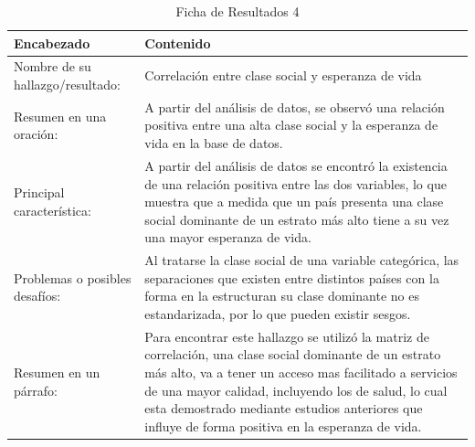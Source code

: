 \begin{table}[H]
    \caption{Ficha de Resultados 4}
    \begin{center}
        \begin{tabular}{  m{3cm} | m{12cm}  }
        \hline\textbf{ Encabezado} & \textbf{Contenido }\\ \hline
        Nombre de su hallazgo/resultado: &  Correlación entre clase social y esperanza de vida\\ \hline
        Resumen en una oración: &  A partir del análisis de datos, se observó una relación positiva  entre una alta clase social y la esperanza de vida en la base de datos.
\\ \hline
        Principal característica: &  A partir del análisis de datos se encontró la existencia de una relación positiva entre las dos variables, lo que muestra que a medida que un país presenta una clase social dominante de un estrato más alto tiene a su vez una mayor esperanza de vida.\\ \hline
        Problemas o posibles desafíos: &  Al tratarse la clase social de una variable categórica, las separaciones que existen entre distintos países con la forma en la estructuran su clase dominante no es estandarizada, por lo que pueden existir sesgos. \\ \hline
        Resumen en un párrafo: & Para encontrar este hallazgo se utilizó la matriz de correlación, una clase social dominante de un estrato más alto, va a tener un acceso mas facilitado a servicios de una mayor calidad, incluyendo los de salud, lo cual esta demostrado mediante estudios anteriores que influye de forma positiva en la esperanza de vida. \\ \hline
        \end{tabular}
    \end{center}
\end{table}

